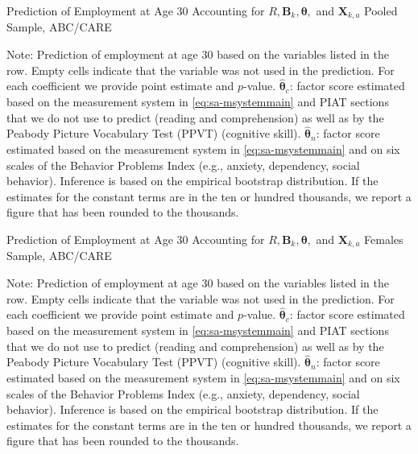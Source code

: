 \begin{table}
\begin{threeparttable}
\caption{Prediction of Employment at Age 30 Accounting for $R, \bm{B}_k, \bm{\theta},$ and $\bm{X}_{k,a}$ Pooled Sample, ABC/CARE}
\label{table:end2}
\centering
\scriptsize

\begin{tablenotes}
\footnotesize
\item Note: Prediction of employment at age 30 based on the variables listed in the row. Empty cells indicate that the variable was not used in the prediction. For each coefficient we provide point estimate and $p$-value. $\hat{\bm{\theta}}_{c}$: factor score estimated based on the measurement system in \eqref{eq:sa-msystemmain} and PIAT sections that we do not use to predict (reading and comprehension) as well as by the Peabody Picture Vocabulary Test (PPVT) (cognitive skill). $\hat{\bm{\theta}}_{n}$: factor score estimated based on the measurement system in \eqref{eq:sa-msystemmain} and on six scales of the Behavior Problems Index (e.g., anxiety, dependency, social behavior). Inference is based on the empirical bootstrap distribution. If the estimates for the constant terms are in the ten or hundred thousands, we report a figure that has been rounded to the thousands.
\end{tablenotes}
\end{threeparttable}
\end{table}

\begin{table}
\begin{threeparttable}
\caption{Prediction of Employment at Age 30 Accounting for $R, \bm{B}_k, \bm{\theta},$ and $\bm{X}_{k,a}$ Females Sample, ABC/CARE}
\label{table:end2}
\centering
\scriptsize

\begin{tablenotes}
\footnotesize
\item Note: Prediction of employment at age 30 based on the variables listed in the row. Empty cells indicate that the variable was not used in the prediction. For each coefficient we provide point estimate and $p$-value. $\hat{\bm{\theta}}_{c}$: factor score estimated based on the measurement system in \eqref{eq:sa-msystemmain} and PIAT sections that we do not use to predict (reading and comprehension) as well as by the Peabody Picture Vocabulary Test (PPVT) (cognitive skill). $\hat{\bm{\theta}}_{n}$: factor score estimated based on the measurement system in \eqref{eq:sa-msystemmain} and on six scales of the Behavior Problems Index (e.g., anxiety, dependency, social behavior). Inference is based on the empirical bootstrap distribution. If the estimates for the constant terms are in the ten or hundred thousands, we report a figure that has been rounded to the thousands.
\end{tablenotes}
\end{threeparttable}
\end{table}

